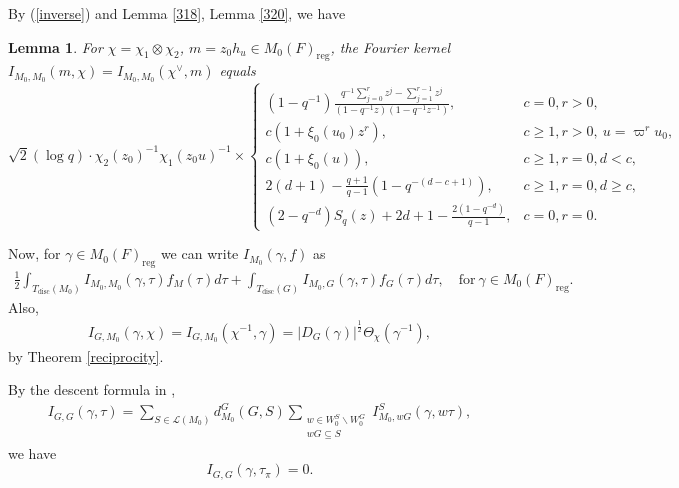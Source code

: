 \documentclass[11pt]{amsart}
\newtheorem {lemma}      [theorem]    {Lemma}
\renewcommand{\rm}{\mathrm}
\theoremstyle{definition}
\numberwithin{equation}{section}
\begin{document}
	By (\ref{inverse}) and Lemma \ref{318}, Lemma \ref{320}, we have
	\begin{lemma}\label{fourier}
		For \(\chi=\chi_1\otimes \chi_2\), \(m=z_0h_u\in M_0(F)_{\rm{reg}}\), the Fourier kernel \(I_{M_0,M_0}(m,\chi)=I_{M_0,M_0}(\chi^\vee,m)\) equals 
		\begin{equation*}
			\sqrt{2} (\log q) \cdot \chi_2(z_0)^{-1} \chi_1(z_0u)^{-1} \times \begin{cases} 
				(1 - q^{-1}) \frac{q^{-1} \sum_{j=0}^r z^j - \sum_{j=1}^{r-1} z^j}{(1 - q^{-1} z)(1 - q^{-1} z^{-1})}, & c = 0, r > 0, \\[1.5ex]
				c(1 + \xi_0(u_0)z^r), & c \ge 1, r > 0, \ u = \varpi^r u_0, \\[1.5ex]
				c(1 + \xi_0(u)), & c \ge 1, r = 0, d < c, \\[1.5ex]
				2(d + 1) - \frac{q + 1}{q - 1} \left( 1 - q^{-(d - c + 1)} \right), & c \ge 1, r = 0, d \ge c, \\[1.5ex]
				(2 - q^{-d}) S_q(z) + 2d + 1 - \frac{2(1 - q^{-d})}{q - 1}, & c = 0, r = 0.
			\end{cases}
		\end{equation*}
	\end{lemma}
	Now, for \(\gamma\in M_{0}(F)_{\rm{reg}}\) we can write \(I_{M_0}(\gamma,f)\) as
	\begin{align*}
		\frac{1}{2}\int_{T_{\rm{disc}}(M_0)}I_{M_0,M_0}(\gamma,\tau)f_M(\tau)d\tau+\int_{T_{\rm{disc}}(G)}I_{M_0,G}(\gamma,\tau)f_G(\tau)d\tau,\quad \text{for}\ \gamma\in M_0(F)_{\rm{reg}}.
	\end{align*}
    Also,
	\begin{align}\label{f12}
		I_{G,M_0}(\gamma,\chi)=I_{G,M_0}(\chi^{-1}, \gamma) = |D_G(\gamma)|^{\frac{1}{2}} \Theta_{\chi}( \gamma^{-1}),
	\end{align}
	by Theorem \ref{reciprocity}.
	
	
	By the descent formula in \cite{Art94},
	\begin{align}\label{GG}
		I_{G,G}(\gamma, \tau) = \sum_{S \in \mathcal{L}(M_0)} d_{M_0}^G(G, S) \sum_{\substack{w \in W_0^S \backslash W_0^G \\ wG \subseteq S}} I_{M_0, wG}^S (\gamma, w\tau),
	\end{align}
	we have \[I_{G,G}(\gamma,\tau_\pi)=0.\]
    
\end{document}
